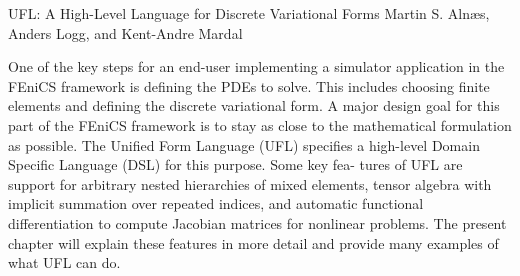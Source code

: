               {UFL: A High-Level Language for Discrete Variational Forms}
              {Martin S. Aln\ae{}s, Anders Logg, and Kent-Andre Mardal}

\editornote{[alnes-1]}

One of the key steps for an end-user implementing a simulator
application in the FEniCS framework is defining the PDEs to
solve. This includes choosing finite elements and defining the
discrete variational form. A major design goal for this part of the
FEniCS framework is to stay as close to the mathematical formulation
as possible. The Unified Form Language (UFL) specifies a high-level
Domain Specific Language (DSL) for this purpose. Some key fea- tures
of UFL are support for arbitrary nested hierarchies of mixed elements,
tensor algebra with implicit summation over repeated indices, and
automatic functional differentiation to compute Jacobian matrices for
nonlinear problems. The present chapter will explain these features
in more detail and provide many examples of what UFL can do.
